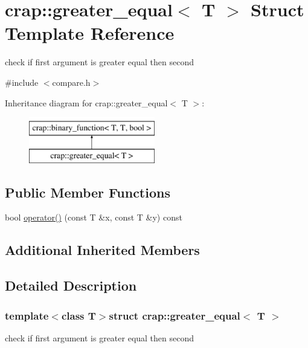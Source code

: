 \hypertarget{structcrap_1_1greater__equal}{\section{crap\-:\-:greater\-\_\-equal$<$ T $>$ Struct Template Reference}
\label{structcrap_1_1greater__equal}
}


check if first argument is greater equal then second  




{\ttfamily \#include $<$compare.\-h$>$}

Inheritance diagram for crap\-:\-:greater\-\_\-equal$<$ T $>$\-:\begin{figure}[H]
\begin{center}
\leavevmode
\includegraphics[height=2.000000cm]{structcrap_1_1greater__equal}
\end{center}
\end{figure}
\subsection*{Public Member Functions}
\begin{DoxyCompactItemize}
\item 
bool \hyperlink{structcrap_1_1greater__equal_a607e6ea7bc9c9f41c6b63e7eae803a41}{operator()} (const T \&x, const T \&y) const 
\end{DoxyCompactItemize}
\subsection*{Additional Inherited Members}


\subsection{Detailed Description}
\subsubsection*{template$<$class T$>$struct crap\-::greater\-\_\-equal$<$ T $>$}

check if first argument is greater equal then second 

